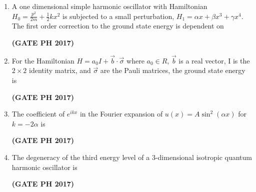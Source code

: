 \documentclass[14pt, a4paper]{extarticle}
\renewcommand{\vec}[1]{\overrightarrow{#1}}
\begin{document}
\begin{enumerate}[label=\textbf{Q.\arabic*}]
\item A one dimensional simple harmonic oscillator with Hamiltonian $H_0 = \frac{p^2}{2m} + \frac{1}{2} k x^2$ is subjected to a small perturbation, $H_1 = \alpha x + \beta x^3 + \gamma x^4$. The first order correction to the ground state energy is dependent on
\begin{enumerate}
\end{enumerate}
\hfill \textbf{(GATE PH 2017)}

\item For the Hamiltonian $H=a_0 I + \vec{b} \cdot \vec{\sigma}$ where $a_0 \in R$, $\vec{b}$ is a real vector, I is the $2\times2$ identity matrix, and $\vec{\sigma}$ are the Pauli matrices, the ground state energy is
\begin{enumerate}
\end{enumerate}
\hfill \textbf{(GATE PH 2017)}

\item The coefficient of $e^{ikx}$ in the Fourier expansion of $u(x)=A \sin^2(\alpha x)$ for $k=-2\alpha$ is
\begin{enumerate}
\end{enumerate}
\hfill \textbf{(GATE PH 2017)}

\item The degeneracy of the third energy level of a 3-dimensional isotropic quantum harmonic oscillator is
\begin{enumerate}
\end{enumerate}
\hfill \textbf{(GATE PH 2017)}


\end{enumerate}
\end{document}
